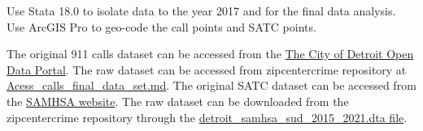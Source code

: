 \documentclass[12pt]{article}
\begin{document}
Use Stata 18.0 to isolate data to the year 2017 and for the final data analysis. Use ArcGIS Pro to geo-code the call points and SATC points. 

The original 911 calls dataset can be accessed from the \href{https://data.detroitmi.gov}{The City of Detroit Open Data Portal}. The raw dataset can be accessed from zipcentercrime repository at \href{https://github.com/ecn310/course-project-zipcentercrime/blob/main/Reproducibility%20Package/RawData/Acess_calls_final_data_set.md}{Acess\_calls\_final\_data\_set.md}. The original SATC dataset can be accessed from the \href{https://www.samhsa.gov}{SAMHSA website}. The raw dataset can be downloaded from the zipcentercrime repository through the \href{https://github.com/ecn310/course-project-zipcentercrime/blob/main/Reproducibility%20Package/RawData/detroit_samhsa_sud_2015_2021.dta}{detroit\_samhsa\_sud\_2015\_2021.dta file}.
\end{document}
